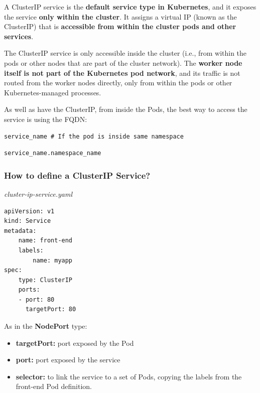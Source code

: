 \documentclass{article}
\newenvironment{blocktemplate}[1]{%
    \tcolorbox[beamer,%
    noparskip,breakable,
    colframe=Blue,%
    colbacklower=LimeGreen!75!LightGreen,%
    title=#1]}%
    {\endtcolorbox}
\newenvironment{codetemplate}[1][]{%
  \mybasecolorbox[#1]
  \itshape
}{%
  \endmybasecolorbox
}
\begin{document}
A ClusterIP service is the \textbf{default service type in Kubernetes}, 
and it exposes the service \textbf{only within the cluster}. 
It assigns a virtual IP (known as the ClusterIP) that is \textbf{accessible from within the cluster pods and other services}.

The ClusterIP service is only accessible inside the cluster (i.e., from within the pods or other nodes that are part of the cluster network). The \textbf{worker node itself is not part of the Kubernetes pod network}, and its traffic is not routed from the worker nodes directly, only from within the pods or other Kubernetes-managed processes.

\begin{blocktemplate}{NOTE}
As well as have the ClusterIP, from inside the Pods, the best way to access the service is using the FQDN:
\begin{codetemplate}{}
\begin{verbatim}
service_name # If the pod is inside same namespace
\end{verbatim}
\end{codetemplate}
\begin{codetemplate}{}
\begin{verbatim}
service_name.namespace_name
\end{verbatim}
\end{codetemplate}
\end{blocktemplate}

\subsubsection{How to define a ClusterIP Service?}

\begin{codetemplate}{cluster-ip-service.yaml}
\begin{verbatim}
apiVersion: v1
kind: Service
metadata:
    name: front-end
    labels:
        name: myapp
spec:
    type: ClusterIP
    ports:
    - port: 80
      targetPort: 80
\end{verbatim}
\end{codetemplate}

As in the \textbf{NodePort} type:
\begin{itemize}
    \item \textbf{targetPort:} port exposed by the Pod
    \item \textbf{port:} port exposed by the service
    \item \textbf{selector:} to link the service to a set of Pods, copying the labels from the front-end Pod definition.
\end{itemize}
\end{document}
